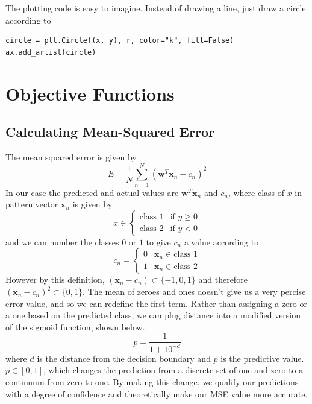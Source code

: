 \documentclass[letterpaper]{article}
\begin{document}
The plotting code is easy to imagine. Instead of drawing a line, just draw
a circle according to
\begin{verbatim}
circle = plt.Circle((x, y), r, color="k", fill=False)
ax.add_artist(circle)
\end{verbatim}

\section{Objective Functions}

\subsection{Calculating Mean-Squared Error}

The mean squared error is given by
\begin{equation*}
E = \frac{1}{N}\sum_{n=1}^N\left(\boldsymbol{w}^T\boldsymbol{x}_n-c_n\right)^2
\end{equation*}
In our case the predicted and actual values are $\boldsymbol{w}^T\boldsymbol{x}_n$
and $c_n$, where class of $x$ in pattern vector $\boldsymbol{x}_n$ is given by
\[
    x \in
    \begin{cases}
    \text{class 1} & \text{if } y\geq 0\\
    \text{class 2} & \text{if } y < 0
    \end{cases}
\]
and we can number the classes $0$ or $1$ to give $c_n$ a value according to
\[
    c_n =
    \begin{cases}
    0 & \boldsymbol{x}_n \in \text{class 1}\\
    1 & \boldsymbol{x}_n \in \text{class 2}
    \end{cases}
\]
However by this definition, $(\boldsymbol{x}_n-c_n)\subset \{-1,0,1\}$ and
therefore $(\boldsymbol{x}_n-c_n)^2\subset \{0,1\}$. The mean of zeroes and
ones doesn't give us a very percise error value, and so we can redefine the
first term. Rather than assigning a zero or a one based on the predicted class,
we can plug distance into a modified version of the sigmoid function, shown
below.
\begin{equation*}
p = \frac{1}{1+10^{-d}}
\end{equation*}
where $d$ is the distance from the decision boundary and $p$ is the predictive
value. $p\in[0,1]$, which changes the prediction from a discrete set of one and
zero to a continuum from zero to one. By making this change, we qualify our
predictions with a degree of confidence and theoretically make our MSE value
more accurate.
\end{document}
